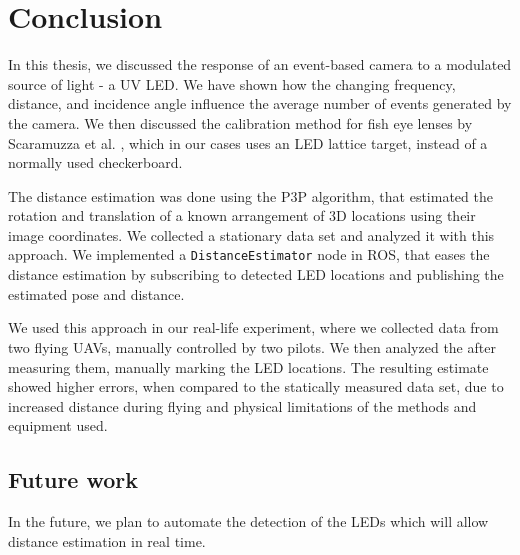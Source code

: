
\chapter{Conclusion\label{chap:conclusion}}

In this thesis, we discussed the response of an event-based camera to a modulated source of light - a \ac{UV} \ac{LED}.
We have shown how the changing frequency, distance, and incidence angle influence the average number of events generated
by the camera. We then discussed the calibration method for fish eye lenses by Scaramuzza et al. \cite{scaramuzzacalibration},
which in our cases uses an \ac{LED} lattice target, instead of a normally used checkerboard.

The distance estimation was done using the \ac{P3P} algorithm, that estimated the rotation and translation of a known
arrangement of 3D locations using their image coordinates. We collected a stationary data set and analyzed it with this
approach. We implemented a \texttt{DistanceEstimator} node in \ac{ROS}, that eases the distance estimation by subscribing
to detected \ac{LED} locations and publishing the estimated pose and distance.

We used this approach in our real-life experiment, where we collected data from two flying \ac{UAV}s, manually controlled by two pilots. We then analyzed the after measuring them, manually marking the \ac{LED} locations. The resulting estimate showed
higher errors, when compared to the statically measured data set, due to increased distance during flying and physical
limitations of the methods and equipment used.

\section{Future work}
In the future, we plan to automate the detection of the \ac{LED}s which will allow distance estimation in real time.

